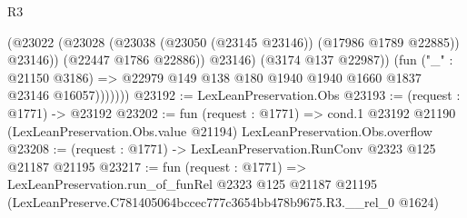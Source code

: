 \begin{lexlean}{R3}
\begin{coremodule}
                      (@23022
                        (@23028 (@23038 (@23050 (@23145 @23146)) (@17986 @1789 @22885)) @23146))
                      (@22447 @1786 @22886))
                    @23146)
                  (@3174 @137 @22987))
                (fun ("_" : @21150 @3186) =>
                @22979 @149 @138 @180 @1940 @1940 @1660 @1837 @23146 @16057)))))))
@23192 := LexLeanPreservation.Obs
@23193 := (request : @1771) -> @23192
@23202 := fun (request : @1771) =>
  cond.{1} @23192 @21190 (LexLeanPreservation.Obs.value @21194) LexLeanPreservation.Obs.overflow
@23208 := (request : @1771) -> LexLeanPreservation.RunConv @2323 @125 @21187 @21195
@23217 := fun (request : @1771) =>
  LexLeanPreservation.run_of_funRel
    @2323
    @125
    @21187
    @21195
    (LexLeanPreserve.C781405064bccec777c3654bb478b9675.R3.__rel_0 @1624)
\end{coremodule}
\end{lexlean}
